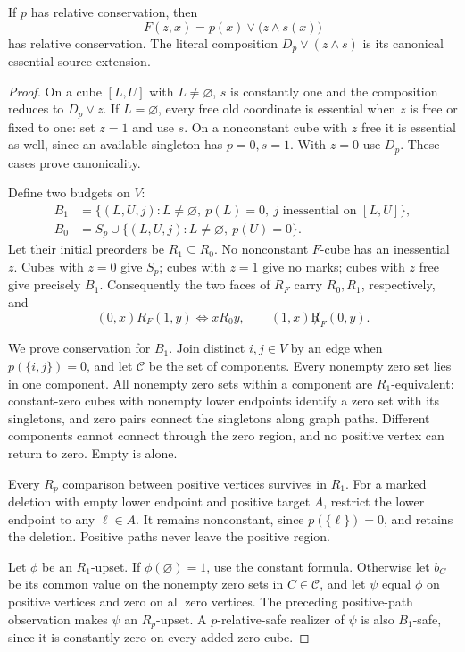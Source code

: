 \begin{theorem}
\label{core:thm:conservation-apex}
If $p$ has relative conservation, then
\[
 F(z,x)=p(x)\lor\bigl(z\land s(x)\bigr)
\]
has relative conservation. The literal composition
$D_p\lor(z\land s)$ is its canonical essential-source extension.
\end{theorem}
\begin{proof}
On a cube $[L,U]$ with $L\ne\varnothing$, $s$ is constantly one and
the composition reduces to $D_p\lor z$. If $L=\varnothing$, every free
old coordinate is essential when $z$ is free or fixed to one: set $z=1$
and use $s$. On a nonconstant cube with $z$ free it is essential as well,
since an available singleton has $p=0,s=1$. With $z=0$ use $D_p$.
These cases prove canonicality.

Define two budgets on $V$:
\[
\begin{aligned}
 B_1&=\{(L,U,j):L\ne\varnothing,\ p(L)=0,
                   \ j\text{ inessential on }[L,U]\},\\
 B_0&=S_p\cup\{(L,U,j):L\ne\varnothing,\ p(U)=0\}.
\end{aligned}
\]
Let their initial preorders be $R_1\subseteq R_0$. No nonconstant
$F$-cube has an inessential $z$. Cubes with $z=0$ give $S_p$; cubes
with $z=1$ give no marks; cubes with $z$ free give precisely $B_1$.
Consequently the two faces of $R_F$ carry $R_0,R_1$, respectively, and
\[
 (0,x)R_F(1,y)\Longleftrightarrow xR_0y,
 \qquad (1,x)\not R_F(0,y).
\]

We prove conservation for $B_1$. Join distinct $i,j\in V$ by an edge
when $p(\{i,j\})=0$, and let $\mathcal C$ be the set of components.
Every nonempty zero set lies in one component. All nonempty zero sets
within a component are $R_1$-equivalent: constant-zero cubes with
nonempty lower endpoints identify a zero set with its singletons, and
zero pairs connect the singletons along graph paths. Different components
cannot connect through the zero region, and no positive vertex can
return to zero. Empty is alone.

Every $R_p$ comparison between positive vertices survives in $R_1$.
For a marked deletion with empty lower endpoint and positive target $A$,
restrict the lower endpoint to any $\ell\in A$. It remains nonconstant,
since $p(\{\ell\})=0$, and retains the deletion. Positive paths never
leave the positive region.

Let $\phi$ be an $R_1$-upset. If $\phi(\varnothing)=1$, use the constant
formula. Otherwise let $b_C$ be its common value on the nonempty zero
sets in $C\in\mathcal C$, and let $\psi$ equal $\phi$ on positive vertices and zero
on all zero vertices. The preceding positive-path observation makes
$\psi$ an $R_p$-upset. A $p$-relative-safe realizer of $\psi$ is also
$B_1$-safe, since it is constantly zero on every added zero cube.


\end{proof}
